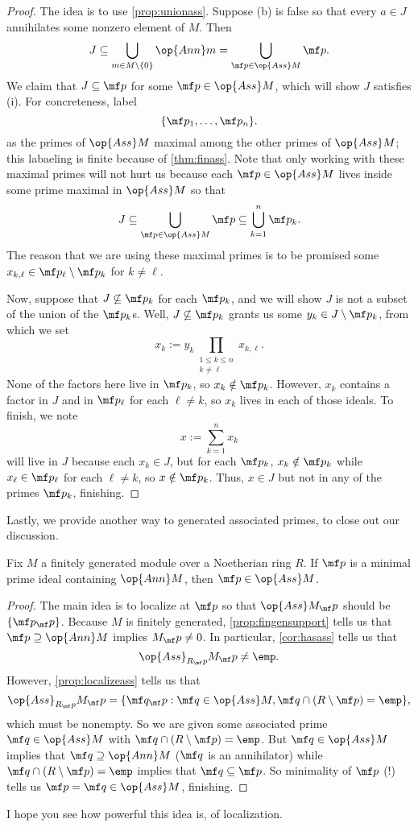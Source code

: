 \begin{proof}
	The idea is to use \autoref{prop:unionass}. Suppose (b) is false so that every $a\in J$ annihilates some nonzero element of $M$. Then
	\[J\subseteq\bigcup_{m\in M\setminus\{0\}}\op{Ann}m=\bigcup_{\mf p\in\op{Ass}M}\mf p.\]
	We claim that $J\subseteq\mf p$ for some $\mf p\in\op{Ass}M$, which will show $J$ satisfies (i). For concreteness, label
	\[\{\mf p_1,\ldots,\mf p_n\}.\]
	as the primes of $\op{Ass}M$ maximal among the other primes of $\op{Ass}M$; this labaeling is finite because of \autoref{thm:finass}. Note that only working with these maximal primes will not hurt us because each $\mf p\in\op{Ass}M$ lives inside some prime maximal in $\op{Ass}M$ so that
	\[J\subseteq\bigcup_{\mf p\in\op{Ass}M}\mf p\subseteq\bigcup_{k=1}^n\mf p_k.\]
	The reason that we are using these maximal primes is to be promised some $x_{k,\ell}\in\mf p_\ell\setminus\mf p_k$ for $k\ne\ell$.
	
	Now, suppose that $J\not\subseteq\mf p_k$ for each $\mf p_k$, and we will show $J$ is not a subset of the union of the $\mf p_k$s. Well, $J\not\subseteq\mf p_k$ grants us some $y_k\in J\setminus\mf p_k$, from which we set
	\[x_k:=y_k\prod_{\substack{1\le k\le n\\k\ne\ell}}x_{k,\ell}.\]
	None of the factors here live in $\mf p_k$, so $x_k\notin\mf p_k$. However, $x_k$ contains a factor in $J$ and in $\mf p_\ell$ for each $\ell\ne k$, so $x_k$ lives in each of those ideals. To finish, we note
	\[x:=\sum_{k=1}^nx_k\]
	will live in $J$ because each $x_k\in J$, but for each $\mf p_k$, $x_k\notin\mf p_k$ while $x_\ell\in\mf p_\ell$ for each $\ell\ne k$, so $x\notin\mf p_k$. Thus, $x\in J$ but not in any of the primes $\mf p_k$, finishing.
\end{proof}
Lastly, we provide another way to generated associated primes, to close out our discussion.
\begin{prop}
	Fix $M$ a finitely generated module over a Noetherian ring $R$. If $\mf p$ is a minimal prime ideal containing $\op{Ann}M$, then $\mf p\in\op{Ass}M$.
\end{prop}
\begin{proof}
	The main idea is to localize at $\mf p$ so that $\op{Ass}M_\mf p$ should be $\{\mf p_\mf p\}$. Because $M$ is finitely generated, \autoref{prop:fingensupport} tells us that $\mf p\supseteq\op{Ann}M$ implies $M_\mf p\ne0$. In particular, \autoref{cor:hasass} tells us that
	\[\op{Ass}_{R_\mf p}M_\mf p\ne\emp.\]
	However, \autoref{prop:localizeass} tells us that
	\[\op{Ass}_{R_\mf p}M_\mf p=\{\mf q_\mf p:\mf q\in\op{Ass}M,\mf q\cap(R\setminus\mf p)=\emp\},\]
	which must be nonempty. So we are given some associated prime $\mf q\in\op{Ass}M$ with $\mf q\cap(R\setminus\mf p)=\emp$. But $\mf q\in\op{Ass}M$ implies that $\mf q\supseteq\op{Ann}M$ ($\mf q$ is an annihilator) while $\mf q\cap(R\setminus\mf p)=\emp$ implies that $\mf q\subseteq\mf p$. So minimality of $\mf p$ (!) tells us $\mf p=\mf q\in\op{Ass}M$, finishing.
\end{proof}
\begin{quot}
	I hope you see how powerful this idea is, of localization.
\end{quot}

